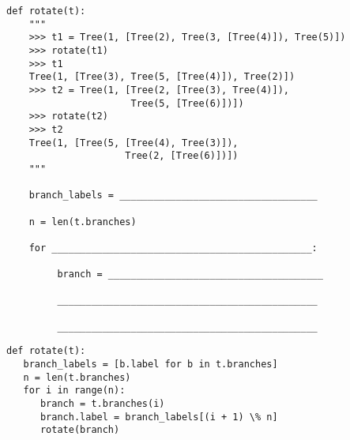 \begin{blocksection}

\begin{lstlisting}
def rotate(t):
    """
    >>> t1 = Tree(1, [Tree(2), Tree(3, [Tree(4)]), Tree(5)])
    >>> rotate(t1)
    >>> t1
    Tree(1, [Tree(3), Tree(5, [Tree(4)]), Tree(2)])
    >>> t2 = Tree(1, [Tree(2, [Tree(3), Tree(4)]), 
                      Tree(5, [Tree(6)])])
    >>> rotate(t2)
    >>> t2
    Tree(1, [Tree(5, [Tree(4), Tree(3)]), 
                     Tree(2, [Tree(6)])])
    """

    branch_labels = ___________________________________

    n = len(t.branches)

    for ______________________________________________:

         branch = ______________________________________

         ______________________________________________

         ______________________________________________ 
\end{lstlisting}
\end{blocksection}
\begin{blocksection}
\begin{solution}
\begin{lstlisting}
def rotate(t):
   branch_labels = [b.label for b in t.branches]
   n = len(t.branches)
   for i in range(n):
      branch = t.branches(i)
      branch.label = branch_labels[(i + 1) \% n]
      rotate(branch)
\end{lstlisting}
\end{solution}
\end{blocksection}
